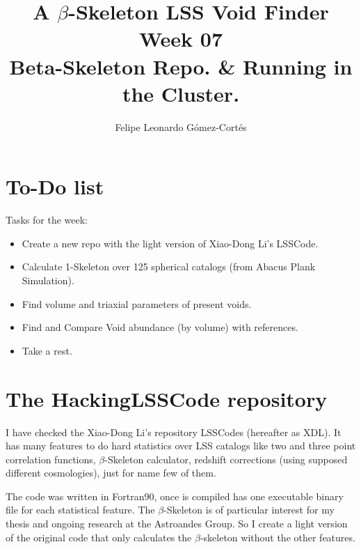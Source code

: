 \documentclass[preprint]{aastex62}
\begin{document}
\title{A $\beta$-Skeleton LSS Void Finder\\Week 07\\Beta-Skeleton Repo. \& Running in the Cluster.}


\author{Felipe Leonardo Gómez-Cortés}

%

\section*{To-Do list}

Tasks for the week:
\begin{itemize}
    \item Create a new repo with the light version of Xiao-Dong Li's LSSCode.
    \item Calculate 1-Skeleton over 125 spherical catalogs (from Abacus Plank Simulation).
    \item Find volume and triaxial parameters of present voids.
    \item Find and Compare Void abundance (by volume) with references.
    \item Take a rest.
\end{itemize}

\section{The HackingLSSCode repository}

I have checked the Xiao-Dong Li's repository LSSCodes (hereafter as XDL). It has many features to do
hard statistics over LSS catalogs like two and three point correlation functions,
$\beta$-Skeleton calculator, redshift corrections (using supposed different cosmologies),
just for name few of them.

The code was written in Fortran90, once is compiled has one executable binary file for
each statistical feature. The $\beta$-Skeleton is of particular interest for my thesis
and ongoing research at the Astroandes Group. So I create a light version of the original
code that only calculates the $\beta$-skeleton without the other features.
\end{document}
